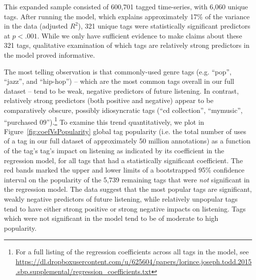This expanded sample consisted of 600,701 tagged time-series, with 6,060 unique tags. After running the model, which explains approximately 17\% of the variance in the data (adjusted $R^{2}$), 321 unique tags were statistically significant predictors at $p <.001$. While we only have sufficient evidence to make claims about these 321 tags, qualitative examination of which tags are relatively strong predictors in the model proved informative.

The most telling observation is that commonly-used genre tags (e.g. ``pop'', ``jazz'', and ``hip-hop'') -- which are the most common tags overall in our full dataset -- tend to be weak, negative predictors of future listening. In contrast, relatively strong predictors (both positive and negative) appear to be comparatively obscure, possibly idiosyncratic tags (``cd collection'', ``mymusic'', ``purchased 09'').\footnote{For a full listing of the regression coefficients across all tags in the model, see \url{https://dl.dropboxusercontent.com/u/625604/papers/lorince.joseph.todd.2015.sbp.supplemental/regression_coefficients.txt}}  To examine this trend quantitatively, we plot in Figure~\ref{fig:coefVsPopularity} global tag popularity (i.e. the total number of uses of a tag in our full dataset of approximately 50 million annotations) as a function of the tag's tag's impact on listening as indicated by its coefficient in the regression model, for all tags that had a statistically significant coefficient.  The red bands marked the upper and lower limits of a bootstrapped 95\% confidence interval on the popularity of the 5,739 remaining tags that were \emph{not} significant in the regression model. The data suggest that the most popular tags are significant, weakly negative predictors of future listening, while relatively unpopular tags tend to have either strong positive or strong negative impacts on listening. Tags which were not significant in the model tend to be of moderate to high popularity.

